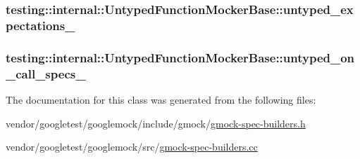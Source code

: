 \subsubsection[{\texorpdfstring{untyped\+\_\+expectations\+\_\+}{untyped_expectations_}}]{ testing\+::internal\+::\+Untyped\+Function\+Mocker\+Base\+::untyped\+\_\+expectations\+\_\+\hspace{0.3cm}{\ttfamily [protected]}}\hypertarget{classtesting_1_1internal_1_1UntypedFunctionMockerBase_aae4a42a4bace1fcb0cd4bdf1ddd40277}{}\label{classtesting_1_1internal_1_1UntypedFunctionMockerBase_aae4a42a4bace1fcb0cd4bdf1ddd40277}
\subsubsection[{\texorpdfstring{untyped\+\_\+on\+\_\+call\+\_\+specs\+\_\+}{untyped_on_call_specs_}}]{ testing\+::internal\+::\+Untyped\+Function\+Mocker\+Base\+::untyped\+\_\+on\+\_\+call\+\_\+specs\+\_\+\hspace{0.3cm}{\ttfamily [protected]}}\hypertarget{classtesting_1_1internal_1_1UntypedFunctionMockerBase_aed2a1913f6c03fd47c8900039556be34}{}\label{classtesting_1_1internal_1_1UntypedFunctionMockerBase_aed2a1913f6c03fd47c8900039556be34}


The documentation for this class was generated from the following files\+:\begin{DoxyCompactItemize}
\item 
vendor/googletest/googlemock/include/gmock/\hyperlink{gmock-spec-builders_8h}{gmock-\/spec-\/builders.\+h}\item 
vendor/googletest/googlemock/src/\hyperlink{gmock-spec-builders_8cc}{gmock-\/spec-\/builders.\+cc}\end{DoxyCompactItemize}
